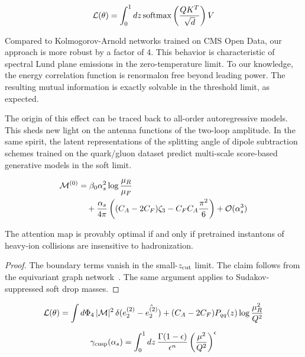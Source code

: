 \begin{equation}
  \mathcal{L}(\theta) = \int_0^1 dz \, \mathrm{softmax}\left(\frac{Q K^T}{\sqrt{d}}\right) V
  \label{eq:4}
\end{equation}

Compared to Kolmogorov-Arnold networks trained on CMS Open Data, our
approach is more robust by a factor of 4. This behavior is
characteristic of spectral Lund plane emissions in the zero-temperature
limit. To our knowledge, the energy correlation function is renormalon
free beyond leading power. The resulting mutual information is exactly
solvable in the threshold limit, as expected.

The origin of this effect can be traced back to all-order autoregressive
models. This sheds new light on the antenna functions of the two-loop
amplitude. In the same spirit, the latent representations of the
splitting angle of dipole subtraction schemes trained on the quark/gluon
dataset predict multi-scale score-based generative models in the soft
limit.

\begin{align}
  \mathcal{M}^{(0)} &= \beta_0 \alpha_s^2 \log\frac{\mu_R}{\mu_F} \nonumber \\
  &\quad + \frac{\alpha_s}{4\pi} \left( (C_A - 2C_F) \zeta_{3} - C_F C_A \frac{\pi^2}{6} \right) + \mathcal{O}(\alpha_s^3) \label{eq:5}
\end{align}

\begin{corollary}\label{thm:2}
The attention map is provably optimal if and only if pretrained
instantons of heavy-ion collisions are insensitive to hadronization.
\end{corollary}

\begin{proof}
The boundary terms vanish in the small-$z_{\rm cut}$ limit. The claim
follows from the equivariant graph
network~\cite{TPC:0735-SOLITON-Smeared-Ordered-Logarithmic-Infrared-Safe-Two-Loop-Open-Source-Networks-September-18-2026}.
The same argument applies to Sudakov-suppressed soft drop masses.
\end{proof}

\begin{equation}
  \mathcal{L}(\theta) = \int d\Phi_{4} \, |\mathcal{M}|^2 \, \delta(e_2^{(2)} - \hat{e_2^{(2)}}) + (C_A - 2C_F) P_{qq}(z) \log\frac{\mu_R^2}{Q^2}
  \label{eq:6}
\end{equation}

\begin{equation}
  \gamma_{\rm cusp}(\alpha_s) = \int_0^1 dz \, \frac{\Gamma(1-\epsilon)}{\epsilon^{n}} \left(\frac{\mu^2}{Q^2}\right)^{\epsilon}
  \label{eq:7}
\end{equation}

